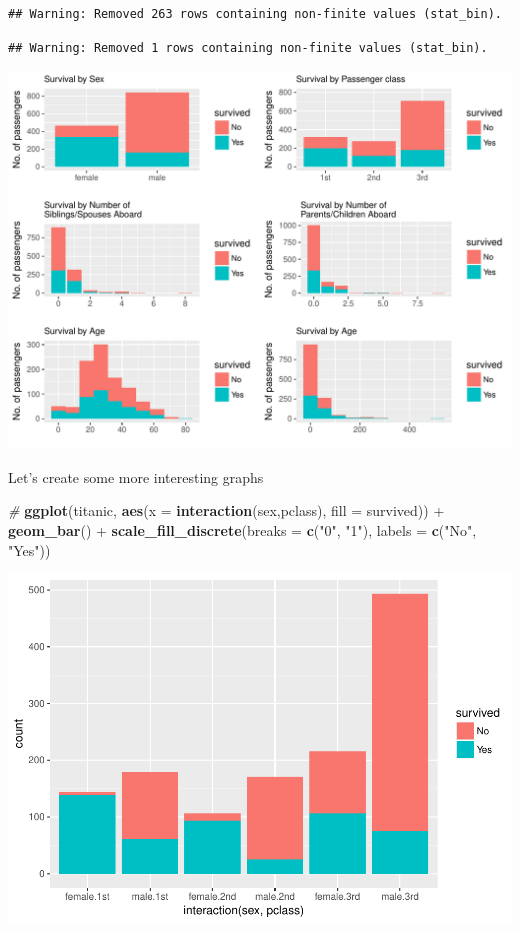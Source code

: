 \documentclass[12,]{article}
\newenvironment{Shaded}{\begin{snugshade}}{\end{snugshade}}
\newcommand{\KeywordTok}[1]{\textcolor[rgb]{0.13,0.29,0.53}{\textbf{{#1}}}}
\newcommand{\DataTypeTok}[1]{\textcolor[rgb]{0.13,0.29,0.53}{{#1}}}
\newcommand{\StringTok}[1]{\textcolor[rgb]{0.31,0.60,0.02}{{#1}}}
\newcommand{\CommentTok}[1]{\textcolor[rgb]{0.56,0.35,0.01}{\textit{{#1}}}}
\newcommand{\NormalTok}[1]{{#1}}
\begin{document}
\begin{verbatim}
## Warning: Removed 263 rows containing non-finite values (stat_bin).
\end{verbatim}

\begin{verbatim}
## Warning: Removed 1 rows containing non-finite values (stat_bin).
\end{verbatim}

\includegraphics{Seminararbeit_1_files/figure-latex/unnamed-chunk-10-1.pdf}

Let's create some more interesting graphs

\begin{Shaded}
\begin{Highlighting}[]
  \CommentTok{# }
\KeywordTok{ggplot}\NormalTok{(titanic, }\KeywordTok{aes}\NormalTok{(}\DataTypeTok{x =} \KeywordTok{interaction}\NormalTok{(sex,pclass), }\DataTypeTok{fill =} \NormalTok{survived)) +}\StringTok{ }\KeywordTok{geom_bar}\NormalTok{() +}\StringTok{ }
\StringTok{    }\KeywordTok{scale_fill_discrete}\NormalTok{(}\DataTypeTok{breaks =} \KeywordTok{c}\NormalTok{(}\StringTok{"0"}\NormalTok{, }\StringTok{"1"}\NormalTok{), }\DataTypeTok{labels =} \KeywordTok{c}\NormalTok{(}\StringTok{"No"}\NormalTok{, }\StringTok{"Yes"}\NormalTok{))}
\end{Highlighting}
\end{Shaded}

\includegraphics{Seminararbeit_1_files/figure-latex/unnamed-chunk-11-1.pdf}
\end{document}
